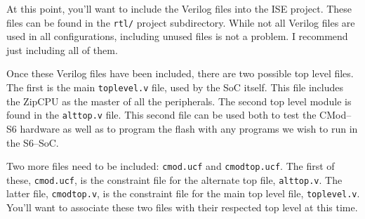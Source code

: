\documentclass{gqtekspec}
\begin{document}
At this point, you'll want to include the Verilog files into the ISE project.
These files can be found in the {\tt rtl/} project subdirectory.  While not
all Verilog files are used in all configurations, including unused files is
not a problem.  I recommend just including all of them.

Once these Verilog files have been included, there are two possible top level
files.  The first is the main {\tt toplevel.v} file, used by the SoC itself.
This file includes the ZipCPU as the master of all the peripherals.  The
second top level module is found in the {\tt alttop.v} file.  This second file
can be used both to test the CMod--S6 hardware as well as to program the flash
with any programs we wish to run in the S6--SoC.

Two more files need to be included: {\tt cmod.ucf} and {\tt cmodtop.ucf}.  The
first of these, {\tt cmod.ucf}, is the constraint file for the alternate top
file, {\tt alttop.v}.  The latter file, {\tt cmodtop.v}, is the constraint file
for the main top level file, {\tt toplevel.v}.  You'll want to associate these
two files with their respected top level at this time.
\end{document}
